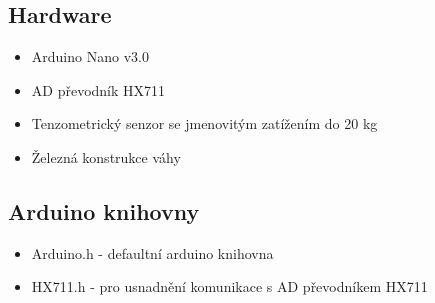 \subsection*{Hardware}
\begin{itemize}
    \item Arduino Nano v3.0
    \item AD převodník HX711
    \item Tenzometrický senzor se jmenovitým zatížením do 20 kg
    \item Železná konstrukce váhy
\end{itemize}

\subsection*{Arduino knihovny}
\begin{itemize}
    \item Arduino.h - defaultní arduino knihovna
    \item HX711.h - pro usnadnění komunikace s AD převodníkem HX711
\end{itemize}




